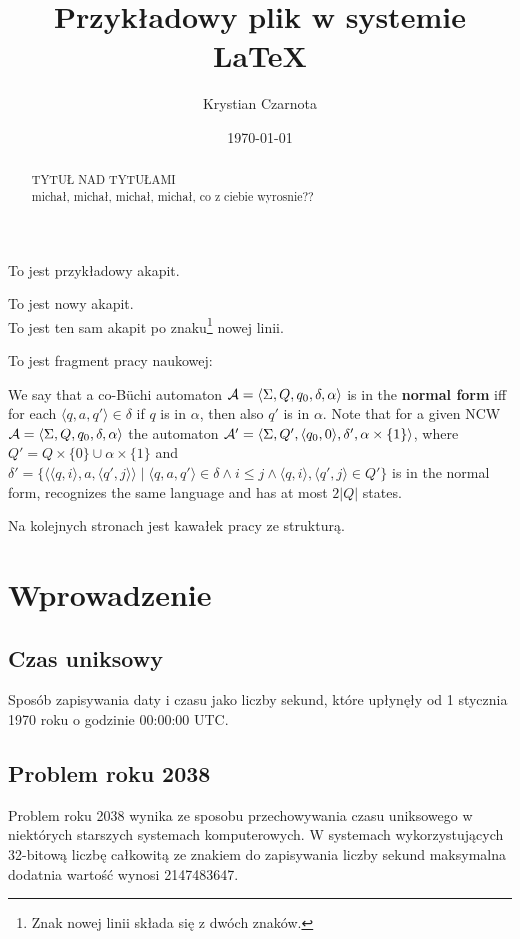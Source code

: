 \documentclass[a4paper]{article}
\author{Krystian Czarnota}
\title{Przykładowy plik w systemie \LaTeX}
\date{\today}
\begin{document}
\maketitle
To jest przykładowy akapit.

To jest nowy akapit.\\
To jest ten sam akapit po znaku\footnote{Znak nowej linii składa się z dwóch znaków.} nowej linii.

To jest fragment pracy naukowej:
\medskip

We say that a co-B\"uchi automaton ${\cal{A}}=\langle \Sigma , Q, q_0, \delta , \alpha\rangle$ is in the {\bf normal form} iff for each $\langle q, a, q'\rangle \in \delta$ if $q$ is in $\alpha$, then also $q'$ is in $\alpha$. Note that for a given NCW 
${\cal{A}}=\langle \Sigma, Q, q_0, \delta , \alpha\rangle$
the automaton ${\cal{A'}}=\langle \Sigma, Q', \langle q_0, 0\rangle, \delta', \alpha\times\{1\}\rangle$, where 
$Q'=Q\times\{0\} \cup \alpha \times \{1\}$ and 
$\delta'=\{\langle \langle q, i\rangle, a, \langle q', j \rangle\rangle \; | \; \langle q, a, q'\rangle \in \delta \wedge i \leq j 
\wedge  \langle q, i\rangle,\langle q', j \rangle\in Q' \}$ 
is in the normal form, recognizes the same language and has at most $2|Q|$ states.

 

\bigskip

 
 Na kolejnych stronach jest kawałek pracy ze strukturą.
\newpage
 
 \begin{abstract}
\maketitle TYTUŁ NAD TYTUŁAMI\\
michał, michał, michał, michał, co z ciebie wyrosnie??
\end{abstract}

\section{Wprowadzenie}
\subsection{Czas uniksowy}
Sposób zapisywania daty i czasu jako liczby sekund, które upłynęły od 1 stycznia 1970 roku o godzinie 00:00:00 UTC.
\subsection{Problem roku 2038}
Problem roku 2038 wynika ze sposobu przechowywania czasu uniksowego w niektórych starszych systemach komputerowych. W systemach wykorzystujących 32-bitową liczbę całkowitą ze znakiem do zapisywania liczby sekund maksymalna dodatnia wartość wynosi 2147483647.
\end{document}
